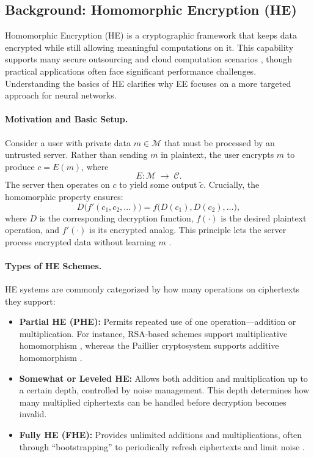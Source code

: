 \documentclass[10pt]{article}
\begin{document}
\subsection{Background: Homomorphic Encryption (HE)}
\label{sec:he_background}

Homomorphic Encryption (HE) is a cryptographic framework that keeps data encrypted while still allowing meaningful computations on it. 
This capability supports many secure outsourcing and cloud computation scenarios \cite{gentry2009fully,cheon2017homomorphic}, though practical applications often face significant performance challenges. 
Understanding the basics of HE clarifies why EE focuses on a more targeted approach for neural networks.

\paragraph{Motivation and Basic Setup.}
Consider a user with private data $m \in \mathcal{M}$ that must be processed by an untrusted server. Rather than sending $m$ in plaintext, the user encrypts $m$ to produce $c = E(m)$, where 
\[
E: \mathcal{M} \;\rightarrow\; \mathcal{C}.
\]
The server then operates on $c$ to yield some output $\tilde{c}$. Crucially, the homomorphic property ensures:
\[
D\bigl(f'(c_1, c_2, \dots)\bigr) 
= 
f\bigl(D(c_1), D(c_2), \dots\bigr),
\]
where $D$ is the corresponding decryption function, $f(\cdot)$ is the desired plaintext operation, and $f'(\cdot)$ is its encrypted analog. This principle lets the server process encrypted data without learning $m$ \cite{rivest1978method,paillier1999public}.

\paragraph{Types of HE Schemes.}
HE systems are commonly categorized by how many operations on ciphertexts they support:
\begin{itemize}
    \item \textbf{Partial HE (PHE):} Permits repeated use of one operation—addition or multiplication. For instance, RSA-based schemes support multiplicative homomorphism \cite{rivest1978method}, whereas the Paillier cryptosystem supports additive homomorphism \cite{paillier1999public}.
    \item \textbf{Somewhat or Leveled HE:} Allows both addition and multiplication up to a certain depth, controlled by noise management. This depth determines how many multiplied ciphertexts can be handled before decryption becomes invalid.
    \item \textbf{Fully HE (FHE):} Provides unlimited additions and multiplications, often through “bootstrapping” to periodically refresh ciphertexts and limit noise \cite{gentry2009fully}.
\end{itemize}
\end{document}
